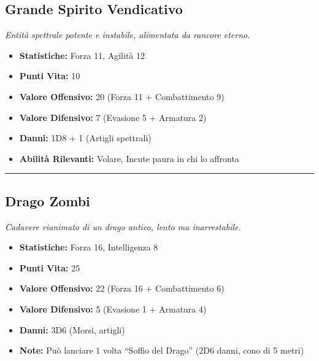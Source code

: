 \documentclass[../manuale_main.tex]{subfiles}
\begin{document}
\subsection*{Grande Spirito Vendicativo}
\textit{Entità spettrale potente e instabile, alimentata da rancore eterno.}
\begin{itemize}
\item \textbf{Statistiche:} Forza 11, Agilità 12
\item \textbf{Punti Vita:} 10
\item \textbf{Valore Offensivo:} 20 (Forza 11 + Combattimento 9)
\item \textbf{Valore Difensivo:} 7 (Evasione 5 + Armatura 2)
\item \textbf{Danni:} 1D8 + 1 (Artigli spettrali)
\item \textbf{Abilità Rilevanti:} Volare, Incute paura in chi lo affronta
\end{itemize}
\vspace{0.2cm}
\noindent
\begin{center}
\rule{\textwidth}{0.4pt} 
\end{center}
\vspace{0.2cm}
\clearpage
\subsection*{Drago Zombi}

\textit{Cadavere rianimato di un drago antico, lento ma inarrestabile.}
\begin{itemize}
\item \textbf{Statistiche:} Forza 16, Intelligenza 8
\item \textbf{Punti Vita:} 25
\item \textbf{Valore Offensivo:} 22 (Forza 16 + Combattimento 6)
\item \textbf{Valore Difensivo:} 5 (Evasione 1 + Armatura 4)
\item \textbf{Danni:} 3D6 (Morsi, artigli)
\item \textbf{Note:} Può lanciare 1 volta “Soffio del Drago” (2D6 danni, cono di 5 metri)
\end{itemize}
\end{document}
